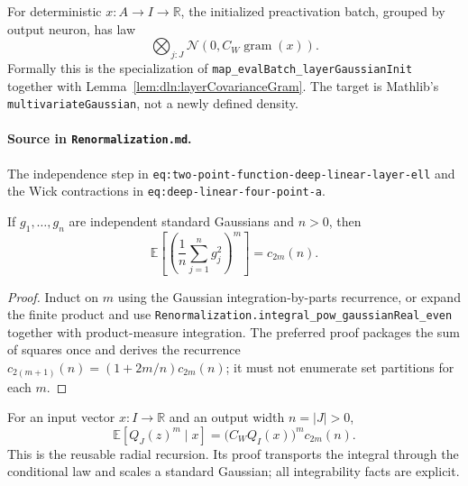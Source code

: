 \begin{theorem}
\label{thm:dln:conditionalLayerLaw}
For deterministic $x:A\to I\to\mathbb R$, the initialized preactivation batch, grouped by output
neuron, has law
\[
 \bigotimes_{j:J}\mathcal N\!\left(0,C_W\operatorname{gram}(x)\right).
\]
Formally this is the specialization of
\texttt{map\_evalBatch\_layerGaussianInit} together with
Lemma~\ref{lem:dln:layerCovarianceGram}.  The target is Mathlib's
\texttt{multivariateGaussian}, not a newly defined density.

\paragraph{Source in \texttt{Renormalization.md}.}
The independence step in \texttt{eq:two-point-function-deep-linear-layer-ell} and the Wick
contractions in \texttt{eq:deep-linear-four-point-a}.
\end{theorem}

\begin{theorem}
\label{thm:dln:gaussianEnergyMoment}
If $g_1,\ldots,g_n$ are independent standard Gaussians and $n>0$, then
\[
 \mathbb E\left[\left(\frac1n\sum_{j=1}^n g_j^2\right)^m\right]=c_{2m}(n).
\]

\begin{proof}
Induct on $m$ using the Gaussian integration-by-parts recurrence, or expand the finite product and
use \texttt{Renormalization.integral\_pow\_gaussianReal\_even} together with product-measure
integration.  The preferred proof packages the sum of squares once and derives the recurrence
$c_{2(m+1)}(n)=(1+2m/n)c_{2m}(n)$; it must not enumerate set partitions for each $m$.
\end{proof}
\end{theorem}

\begin{theorem}
\label{thm:dln:energyStep}
For an input vector $x:I\to\mathbb R$ and an output width $n=|J|>0$,
\[
 \mathbb E\!\left[Q_J(z)^m\mid x\right]
   =\big(C_WQ_I(x)\big)^m c_{2m}(n).
\]
This is the reusable radial recursion.  Its proof transports the integral through the conditional
law and scales a standard Gaussian; all integrability facts are explicit.
\end{theorem}

